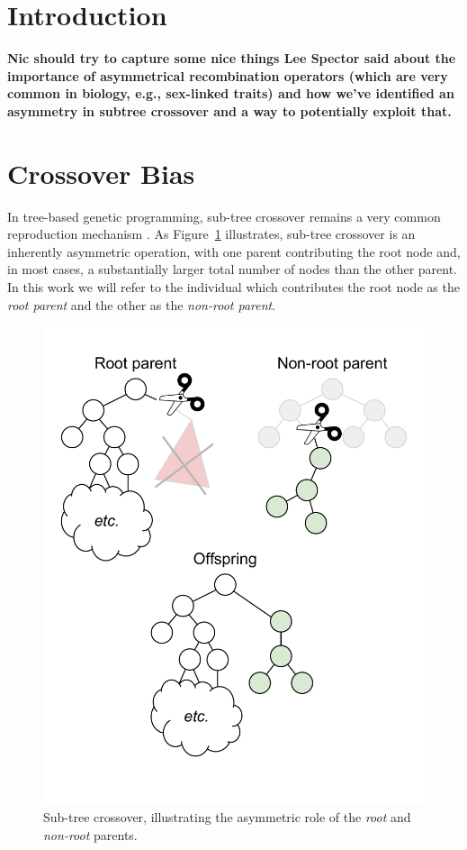 \documentclass{sig-alternate}
\begin{document}
\category{}{}{}
\terms{}

\section{Introduction} \label{sec:Introduction}

\textbf{Nic should try to capture some nice things Lee Spector said about the importance of asymmetrical 
recombination operators (which are very common in biology, e.g., sex-linked traits) and how we've identified an 
asymmetry in subtree crossover and a way to potentially exploit that.}

\section{Crossover Bias} \label{sec:XObias}

In tree-based genetic programming, sub-tree crossover remains a very common reproduction mechanism 
\cite{poli08:fieldguide}. As Figure~\ref{fig:root_parent_illustration} illustrates, sub-tree crossover is an inherently 
asymmetric operation, with one parent contributing the root node and, in most cases, a substantially larger total 
number of nodes than the other parent. In this work we will refer to the individual which contributes the root node as 
the \emph{root parent} and the other as the \emph{non-root parent}. 

\begin{figure}
\centering
\includegraphics[width=0.45 \textwidth]{Plots/Root_parent_illustration.pdf}
\caption{Sub-tree crossover, illustrating the asymmetric role of the \emph{root} and \emph{non-root} parents.}
\label{fig:root_parent_illustration}
\end{figure}
\end{document}
